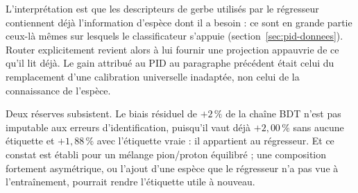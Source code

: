 L'interprétation est que les descripteurs de gerbe utilisés par le régresseur contiennent déjà l'information d'espèce dont il a besoin : ce sont en grande partie ceux-là mêmes sur lesquels le classificateur s'appuie (section~\ref{sec:pid-donnees}). Router explicitement revient alors à lui fournir une projection appauvrie de ce qu'il lit déjà. Le gain attribué au PID au paragraphe précédent était celui du remplacement d'une calibration universelle inadaptée, non celui de la connaissance de l'espèce.

Deux réserves subsistent. Le biais résiduel de $+2\,\%$ de la chaîne BDT n'est pas imputable aux erreurs d'identification, puisqu'il vaut déjà $+2{,}00\,\%$ sans aucune étiquette et $+1{,}88\,\%$ avec l'étiquette vraie : il appartient au régresseur. Et ce constat est établi pour un mélange pion/proton équilibré ; une composition fortement asymétrique, ou l'ajout d'une espèce que le régresseur n'a pas vue à l'entraînement, pourrait rendre l'étiquette utile à nouveau.

